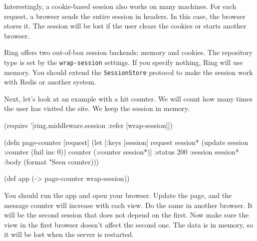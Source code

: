 Interestingly, a cookie-based session also works on many machines. For each request, a browser sends the entire session in headers. In this case, the browser stores it. The session will be lost if the user clears the cookies or starts another browser.

Ring offers two out-of-box session backends: memory and cookies. The repository type is set by the \verb|wrap-session| settings. If you specify nothing, Ring will use memory. You should extend the \verb|SessionStore| protocol to make the session work with Redis or another system.

Next, let's look at an example with a hit counter. We will count how many times the user has visited the site. We keep the session in memory.


\ifx\DEVICETYPE\MOBILE

\begin{english}
  \begin{clojure}
(require '[ring.middleware.session
           :refer [wrap-session]])

(defn page-counter [request]
  (let [{:keys [session]} request
        session* (update session
                   :counter (fnil inc 0))
        counter (:counter session*)]
    {:status 200
     :session session*
     :body (format "Seen %
                   counter)}))

(def app (-> page-counter
             wrap-session))
  \end{clojure}
\end{english}

\else

\begin{english}
\end{english}

\fi

You should run the app and open your browser. Update the page, and the message counter will increase with each view. Do the same in another browser. It will be the second session that does not depend on the first. Now make sure the view in the first browser doesn't affect the second one. The data is in memory, so it will be lost when the server is restarted.

